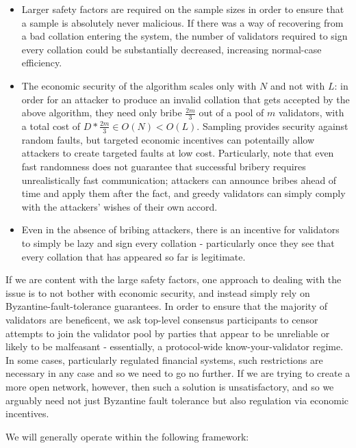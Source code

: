 \documentclass[11pt,a4paper]{article}
\theoremstyle{plain}
\theoremstyle{definition}
\theoremstyle{remark}
\begin{document}
\begin{itemize}
\item
Larger safety factors are required on the sample sizes in order to ensure that a sample is absolutely never malicious. If there was a way of recovering from a bad collation entering the system, the number of validators required to sign every collation could be substantially decreased, increasing normal-case efficiency.
\item
The economic security of the algorithm scales only with $N$ and not with $L$: in order for an attacker to produce an invalid collation that gets accepted by the above algorithm, they need only bribe $\frac{2m}{3}$ out of a pool of $m$ validators, with a total cost of $D * \frac{2m}{3} \in O(N) < O(L)$. Sampling provides security against random faults, but targeted economic incentives can potentailly allow attackers to create targeted faults at low cost. Particularly, note that even fast randomness does not guarantee that successful bribery requires unrealistically fast communication; attackers can announce bribes ahead of time and apply them after the fact, and greedy validators can simply comply with the attackers' wishes of their own accord.
\item
Even in the absence of bribing attackers, there is an incentive for validators to simply be lazy and sign every collation - particularly once they see that every collation that has appeared so far is legitimate.
\end{itemize}

If we are content with the large safety factors, one approach to dealing with the issue is to not bother with economic security, and instead simply rely on Byzantine-fault-tolerance guarantees. In order to ensure that the majority of validators are beneficent, we ask top-level consensus participants to censor attempts to join the validator pool by parties that appear to be unreliable or likely to be malfeasant - essentially, a protocol-wide know-your-validator regime. In some cases, particularly regulated financial systems, such restrictions are necessary in any case and so we need to go no further\cite{swanson}. If we are trying to create a more open network, however, then such a solution is unsatisfactory, and so we arguably need not just Byzantine fault tolerance but also regulation via economic incentives.

We will generally operate within the following framework:
\end{document}
